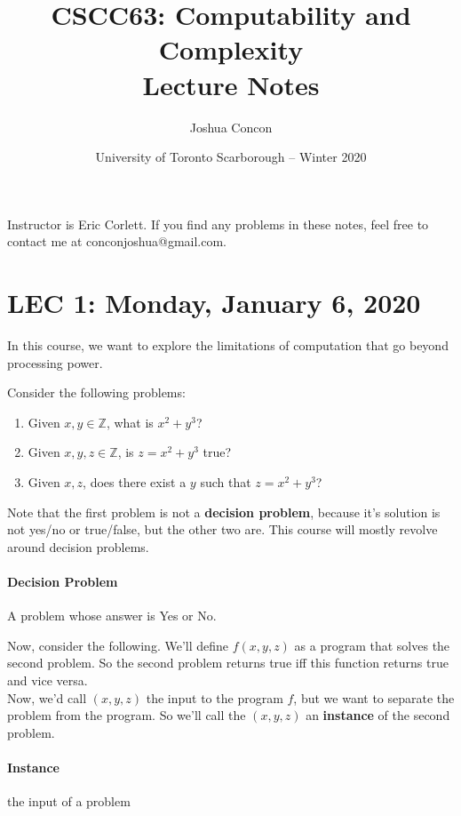 \documentclass[12pt]{article}
\begin{document}
\title{CSCC63: Computability and Complexity\\ Lecture Notes}
\date{University of Toronto Scarborough -- Winter 2020}
\author{Joshua Concon}
\maketitle
Instructor is Eric Corlett. If you find any problems in these notes, feel free to contact me at conconjoshua@gmail.com.

\tableofcontents

\pagebreak

\section{LEC 1: Monday, January 6, 2020}

In this course, we want to explore the limitations of computation that go beyond processing power.

Consider the following problems:

\begin{enumerate}
  \item Given $x,y \in \mathbb{Z}$, what is $x^2 + y^3$?
  \item Given $x,y,z \in \mathbb{Z}$, is $z = x^2 + y^3$ true?
  \item Given $x,z$, does there exist a $y$ such that $z = x^2 + y^3$?
\end{enumerate}

Note that the first problem is not a \textbf{decision problem}, because it's solution is not yes/no or true/false, but the other two are. This course will mostly revolve around decision problems.

\paragraph{Decision Problem} A problem whose answer is Yes or No.

Now, consider the following. We'll define $f(x,y,z)$ as a program that solves the second problem. So the second problem returns true iff this function returns true and vice versa.
\\
Now, we'd call $(x,y,z)$ the input to the program $f$, but we want to separate the problem from the program. So we'll call the $(x,y,z)$ an \textbf{instance} of the second problem.

\paragraph{Instance} the input of a problem
\end{document}
